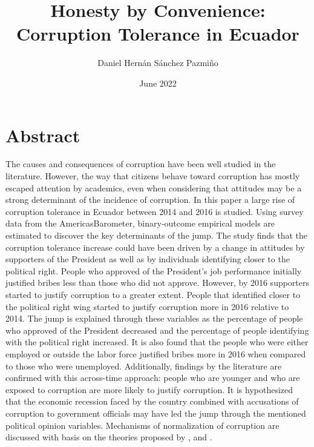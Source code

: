 \documentclass[12pt,a4]{article}\usepackage[]{graphicx}\usepackage[]{xcolor}
\title{Honesty by Convenience: Corruption Tolerance in Ecuador}
\author{Daniel Hernán Sánchez Pazmiño}
\date{June 2022}
\begin{document}
\maketitle
\clearpage






\section*{Abstract}

The causes and consequences of corruption have been well studied in the literature. However, the way that citizens behave toward corruption has mostly escaped attention by academics, even when considering that attitudes may be a strong determinant of the incidence of corruption. In this paper a large rise of corruption tolerance in Ecuador between 2014 and 2016 is studied. Using survey data from the AmericasBarometer, binary-outcome empirical models are estimated to discover the key determinants of the jump. The study finds that the corruption tolerance increase could have been driven by a change in attitudes by supporters of the President as well as by individuals identifying closer to the political right. People who approved of the President's job performance initially justified bribes less than those who did not approve. However, by 2016 supporters started to justify corruption to a greater extent. People that identified closer to the political right wing started to justify corruption more in 2016 relative to 2014. The jump is explained through these variables as the percentage of people who approved of the President decreased and the percentage of people identifying with the political right increased. It is also found that the people who were either employed or outside the labor force justified bribes more in 2016 when compared to those who were unemployed. Additionally, findings by the literature are confirmed with this across-time approach: people who are younger and who are exposed to corruption are more likely to justify corruption. It is hypothesized that the economic recession faced by the country combined with accusations of corruption to government officials may have led the jump through the mentioned political opinion variables. Mechanisms of normalization of corruption are discussed with basis on the theories proposed by \textcite{Ashforth.2003}, \textcite{Hurtado.2007} and \textcite{Adoum.2000}. 
\end{document}
